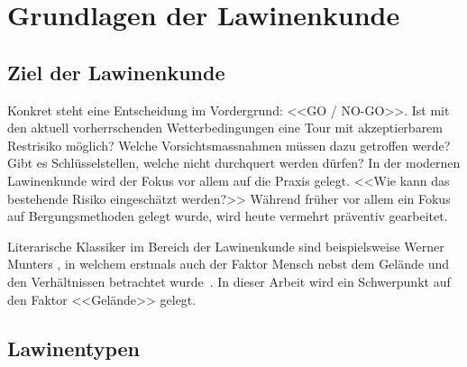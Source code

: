 \clearpage
\section{Grundlagen der Lawinenkunde}
\subsection{Ziel der Lawinenkunde}

Konkret steht eine Entscheidung im Vordergrund: <<GO / NO-GO>>. Ist mit den aktuell vorherrschenden Wetterbedingungen eine Tour mit akzeptierbarem Restrisiko möglich? Welche Vorsichtsmassnahmen müssen dazu getroffen werde? Gibt es Schlüsselstellen, welche nicht durchquert werden dürfen? In der modernen Lawinenkunde wird der Fokus vor allem auf die Praxis gelegt. <<Wie kann das bestehende Risiko eingeschätzt werden?>> Während früher vor allem ein Fokus auf Bergungsmethoden gelegt wurde, wird heute vermehrt präventiv gearbeitet.~\cite{harveyrhynerschweizerlawinenkunde}

Literarische Klassiker im Bereich der Lawinenkunde sind beispielsweise Werner Munters , in welchem erstmals auch der Faktor Mensch nebst dem Gelände und den Verhältnissen betrachtet wurde~\cite{munter}. In dieser Arbeit wird ein Schwerpunkt auf den Faktor <<Gelände>> gelegt.


\subsection{Lawinentypen}

